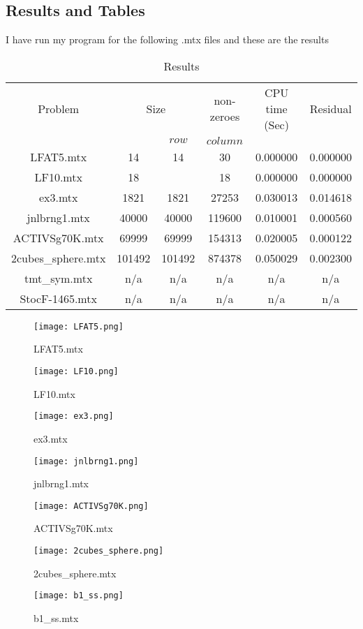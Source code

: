 \documentclass[12pt]{article}
\begin{document}
	\subsection{Results and Tables}
	
	I have run my program for the following .mtx files and these are the results

    \begin{table}[h!]
		\caption{Results}
		\label{table:1}
		\centering
		\begin{tabular}{c c c c c c}
			\hline
			Problem & \multicolumn{2}{c}{Size} & non-zeroes & CPU time (Sec) & Residual \\
			& & $row$ & $column$ & \\
			\hline
            LFAT5.mtx & 14 & 14 & 30 & 0.000000 & 0.000000 \\
			LF10.mtx & 18 &  & 18 & 0.000000 & 0.000000 \\
			ex3.mtx & 1821 & 1821 & 27253 & 0.030013 & 0.014618 \\
			jnlbrng1.mtx & 40000 & 40000 & 119600 & 0.010001 & 0.000560 \\
			ACTIVSg70K.mtx & 69999   & 69999 & 154313 & 0.020005 & 0.000122 \\
			2cubes\_sphere.mtx & 101492  & 101492 & 874378 & 0.050029 & 0.002300 \\
			tmt\_sym.mtx & n/a & n/a & n/a & n/a & n/a \\
			StocF-1465.mtx & n/a & n/a & n/a & n/a & n/a \\ 
			\hline
		\end{tabular}
	\end{table}

	\begin{figure}[H]
		\caption{LFAT5.mtx}
		\centering
		\texttt{[image: LFAT5.png]}
	\end{figure}


	\begin{figure}[H]
		\caption{LF10.mtx}
		\centering
		\texttt{[image: LF10.png]}
	\end{figure}


	\begin{figure}[H]
		\caption{ex3.mtx}
		\centering
		\texttt{[image: ex3.png]}
	\end{figure}

	\begin{figure}[H]
		\caption{jnlbrng1.mtx}
		\centering
		\texttt{[image: jnlbrng1.png]}
	\end{figure}


	\begin{figure}[H]
		\caption{ACTIVSg70K.mtx}
		\centering
		\texttt{[image: ACTIVSg70K.png]}
	\end{figure}

	\begin{figure}[H]
		\caption{2cubes\_sphere.mtx}
		\centering
		\texttt{[image: 2cubes\_sphere.png]}
	\end{figure}
	
	\begin{figure}[H]
		\caption{b1\_ss.mtx}
		\centering
		\texttt{[image: b1\_ss.png]}
	\end{figure}

	
		
\end{document}
